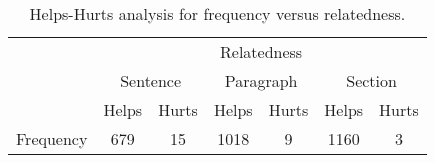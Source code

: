 \begin{table*}[t]
\caption{Helps-Hurts analysis for frequency versus relatedness.}
\label{tab:Helps-Hurts-Analysis}
\begin{tabular}{lcccccc}
\toprule
                                & \multicolumn{6}{c}{Relatedness}                                                              \\ 
                                & \multicolumn{2}{c}{Sentence} & \multicolumn{2}{c}{Paragraph} & \multicolumn{2}{c}{Section} \\ 
                                & Helps         & Hurts         & Helps          & Hurts         & Helps         & Hurts        \\ 
\midrule
\multicolumn{1}{c}{Frequency} & 679           & 15            & 1018           & 9             & 1160          & 3            \\ 
\bottomrule
\end{tabular}
\end{table*}

